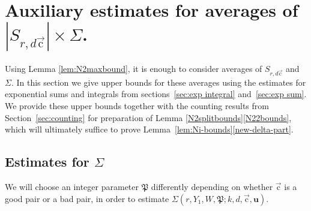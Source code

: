 \documentclass[letterpaper,11pt]{amsart}
\numberwithin{equation}{section}
\theoremstyle{definition}
\numberwithin{equation}{section}
\newcommand{\uu}{\mathbf{u}}
\newcommand{\uc}{{\vec{\mathrm{c}}}}
\begin{document}
\section{Auxiliary estimates for averages of
\texorpdfstring{$|S_{r,d\uc}|\times \Sigma$}{|S\{r,dc\}|×Σ}.}
\label{n2prelim}
Using Lemma \ref{lem:N2maxbound}, it is enough to consider averages of $S_{r,d\uc}$ and $\Sigma$. 
In this section we give upper bounds for these averages using the estimates for exponential sums and integrals from sections~\ref{sec:exp integral} and~\ref{sec:exp sum}. We provide these upper bounds together with the counting results from Section~\ref{sec:counting} for preparation of Lemma \ref{N2splitbounds}\eqref{N22bounds}, which  will ultimately suffice to prove Lemma~\ref{lem:Ni-bounds}\eqref{new-delta-part}. 

\subsection{Estimates for $\Sigma$}

We will choose an integer parameter $\mathfrak P$ differently depending on whether $\uc$ is a good pair or a bad pair, in order to estimate $\Sigma(r, Y_1,W, \mathfrak P;k,d, \uc, \uu)$.
\end{document}
